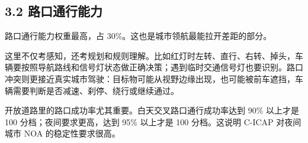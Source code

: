 \subsection{3.2 路口通行能力}

路口通行能力权重最高，占 30\%。这也是城市领航最能拉开差距的部分。

这里不仅考感知，还考规划和规则理解。比如红灯时左转、直行、右转、掉头，车辆要按照导航路线和信号灯状态做正确决策；遇到临时交通信号灯也要识别。路口冲突则更接近真实城市驾驶：目标物可能从视野边缘出现，也可能被前车遮挡，车辆需要判断是否减速、刹停、绕行或继续通过。

开放道路里的路口成功率尤其重要。白天交叉路口通行成功率达到 90\% 以上才是 100 分档；夜间要求更高，达到 95\% 以上才是 100 分档。这说明 C-ICAP 对夜间城市 NOA 的稳定性要求很高。

